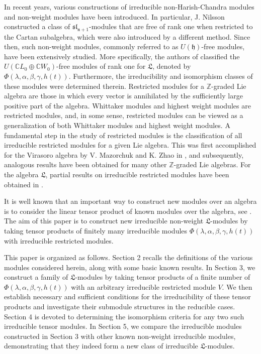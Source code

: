 \documentclass[12pt,leqno,amscd,amsfonts,amssymb]{amsart}
\def\a{\alpha}
\def\b{\beta}
\def\r{\gamma}
\def\Z{\mathbb{Z}}
\def\C{\mathbb{C}}
\numberwithin{equation}{section}
\begin{document}
In recent years, various constructions of irreducible non-Harish-Chandra modules and non-weight modules have been introduced.  In particular, J. Nilsson \cite{N} constructed  a class of  $\mathfrak{sl_{n+1}}$-modules that are free of rank one when restricted to the Cartan subalgebra, which were also introduced by a different method\cite{TZ}.  Since then, such non-weight modules, commonly referred to as $U(\mathfrak{h})$-free modules, have been extensively studied. More specifically, the authors of  \cite{CG} classified the $U(\C L_0\oplus\C W_0)$-free modules of rank one for  $\mathfrak L$, denoted by  $\Phi(\lambda,\a,\b,\r,h(t))$. Furthermore, the irreducibility and isomorphism classes of these modules were determined therein. Restricted modules for a $\Z$-graded Lie algebra are those in which every vector is annihilated by the sufficiently large positive part of the algebra. Whittaker modules and highest weight modules are restricted modules, and, in some sense,  restricted modules can be viewed as a generalization of both  Whittaker modules and highest weight modules. A fundamental step in the study of restricted modules is the classification of all irreducible restricted modules for a given Lie algebra. This was first accomplished for the Virasoro algebra  by V. Mazorchuk  and K. Zhao in \cite{MZ}, and subsequently, analogous results have been obtained for many other $\Z$-graded Lie algebras. For the algebra $\mathfrak L$,  partial results on irreducible restricted modules have been obtained in \cite{LS}.

It is well known that an important way to construct new modules over an algebra is to consider the linear tensor product of known modules over the algebra, see \cite{CGZ,CHSY,CY,GLW,TZ2,TZ3,Z}. The aim of this paper is to construct new irreducible non-weight  $\mathfrak L$-modules by taking tensor products of finitely many irreducible  modules $\Phi(\lambda,\a,\b,\r,h(t))$ with irreducible restricted modules.
	
This paper is organized as follows. Section 2 recalls the definitions of the various modules considered herein, along with some basic known results. In Section 3, we construct a family of $\mathfrak L$-modules by taking tensor products of a finite number of $\Phi(\lambda,\a,\b,\r,h(t))$ with an arbitrary irreducible restricted module $V$. We then establish necessary and sufficient conditions for the irreducibility of these tensor products and investigate their submodule structures in the reducible cases. Section 4 is devoted to determining the isomorphism criteria for any two such irreducible tensor modules. In Section 5, we compare the irreducible modules constructed in Section 3 with other known non-weight irreducible modules, demonstrating that they indeed form a new class of irreducible $\mathfrak L$-modules.
\end{document}
